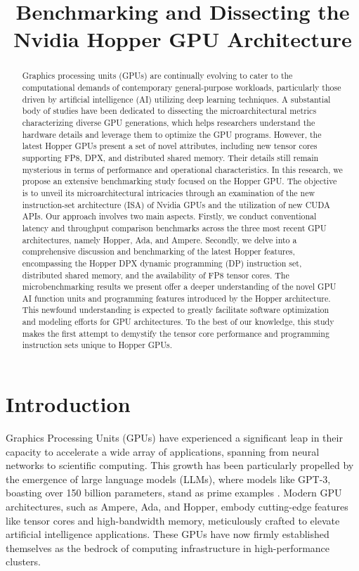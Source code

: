\title{Benchmarking and Dissecting the Nvidia Hopper GPU Architecture}

\begin{abstract}
Graphics processing units (GPUs) are continually evolving to cater to the computational demands of contemporary general-purpose workloads, particularly those driven by artificial intelligence (AI) utilizing deep learning techniques. A substantial body of studies have been dedicated to dissecting the microarchitectural metrics characterizing diverse GPU generations, which helps researchers understand the hardware details and leverage them to optimize the GPU programs. However, the latest Hopper GPUs present a set of novel attributes, including new tensor cores supporting FP8, DPX, and distributed shared memory. Their details still remain mysterious in terms of performance and operational characteristics. In this research, we propose an extensive benchmarking study focused on the Hopper GPU. The objective is to unveil its microarchitectural intricacies through an examination of the new instruction-set architecture (ISA) of Nvidia GPUs and the utilization of new CUDA APIs. Our approach involves two main aspects. Firstly, we conduct conventional latency and throughput comparison benchmarks across the three most recent GPU architectures, namely Hopper, Ada, and Ampere. Secondly, we delve into a comprehensive discussion and benchmarking of the latest Hopper features, encompassing the Hopper DPX dynamic programming (DP) instruction set, distributed shared memory, and the availability of FP8 tensor cores. The microbenchmarking results we present offer a deeper understanding of the novel GPU AI function units and programming features introduced by the Hopper architecture. This newfound understanding is expected to greatly facilitate software optimization and modeling efforts for GPU architectures. To the best of our knowledge, this study makes the first attempt to demystify the tensor core performance and programming instruction sets unique to Hopper GPUs.
\end{abstract}

\section{Introduction}
Graphics Processing Units (GPUs) have experienced a significant leap in their capacity to accelerate a wide array of applications, spanning from neural networks to scientific computing. This growth has been particularly propelled by the emergence of large language models (LLMs), where models like GPT-3, boasting over 150 billion parameters, stand as prime examples \cite{floridi2020gpt}. Modern GPU architectures, such as Ampere, Ada, and Hopper, embody cutting-edge features like tensor cores and high-bandwidth memory, meticulously crafted to elevate artificial intelligence applications. These GPUs have now firmly established themselves as the bedrock of computing infrastructure in high-performance clusters.

